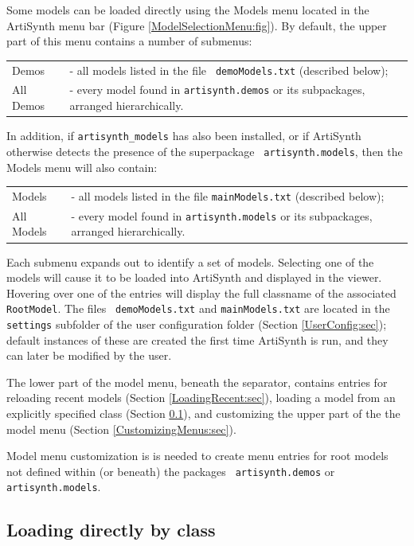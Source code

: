 \documentclass{article}
\begin{document}
Some models can be loaded directly using the {\sf Models} menu located
in the ArtiSynth menu bar (Figure \ref{ModelSelectionMenu:fig}). By
default, the upper part of this menu contains a number of submenus:

\begin{tabular}{ll} {\sf Demos} & - all models listed in the file {\tt
demoModels.txt} (described below);\\
{\sf All Demos} & - every model found in {\tt artisynth.demos} or its
subpackages, arranged hierarchically.
\end{tabular}

In addition, if {\tt artisynth\_models} has also been installed, or if
ArtiSynth otherwise detects the presence of the superpackage {\tt
artisynth.models}, then the {\sf Models} menu will also contain:

\begin{tabular}{ll} {\sf Models} & - all models listed in the file
{\tt mainModels.txt} (described below);\\
{\sf All Models} & - every model found in {\tt artisynth.models} or
its subpackages, arranged hierarchically.
\end{tabular}

Each submenu expands out to identify a set of models. Selecting one of
the models will cause it to be loaded into ArtiSynth and displayed in
the viewer. Hovering over one of the entries will display the full
classname of the associated {\tt RootModel}.  The files {\tt
demoModels.txt} and {\tt mainModels.txt} are located in the {\tt
settings} subfolder of the user configuration folder (Section
\ref{UserConfig:sec}); default instances of these are created the
first time ArtiSynth is run, and they can later be modified by the
user.

The lower part of the model menu, beneath the separator, contains
entries for reloading recent models (Section \ref{LoadingRecent:sec}),
loading a model from an explicitly specified class (Section
\ref{LoadingByClass:sec}), and customizing the upper part of the the
model menu (Section \ref{CustomizingMenus:sec}).

\begin{sideblock}
Model menu customization is is needed to create menu entries for root
models not defined within (or beneath) the packages {\tt
artisynth.demos} or {\tt artisynth.models}.
\end{sideblock}

\subsection{Loading directly by class}
\label{LoadingByClass:sec}
\end{document}
